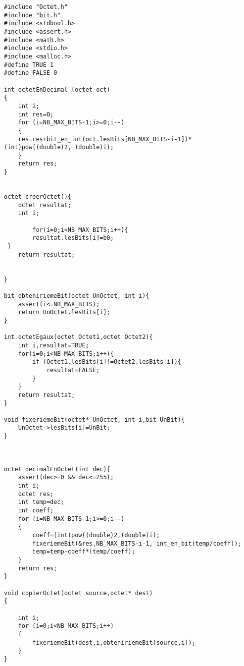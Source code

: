 \begin{verbatim}
#include "Octet.h"
#include "bit.h"
#include <stdbool.h>
#include <assert.h>
#include <math.h>
#include <stdio.h>
#include <malloc.h>
#define TRUE 1
#define FALSE 0

int octetEnDecimal (octet oct)
{
	int i;
	int res=0;
	for (i=NB_MAX_BITS-1;i>=0;i--)
	{
	res=res+bit_en_int(oct.lesBits[NB_MAX_BITS-i-1])* (int)pow((double)2, (double)i);
	}
	return res;
}


octet creerOctet(){
    octet resultat;
    int i;

		for(i=0;i<NB_MAX_BITS;i++){
        resultat.lesBits[i]=b0;
 }
    return resultat;


}

bit obteniriemeBit(octet UnOctet, int i){
    assert(i<=NB_MAX_BITS);
    return UnOctet.lesBits[i];
}

int octetEgaux(octet Octet1,octet Octet2){
    int i,resultat=TRUE;
    for(i=0;i<NB_MAX_BITS;i++){
        if (Octet1.lesBits[i]!=Octet2.lesBits[i]){
            resultat=FALSE;
        }
    }
    return resultat;
}

void fixeriemeBit(octet* UnOctet, int i,bit UnBit){
    UnOctet->lesBits[i]=UnBit;
}



octet decimalEnOctet(int dec){
	assert(dec>=0 && dec<=255);
	int i;
	octet res;
	int temp=dec;
	int coeff;
	for (i=NB_MAX_BITS-1;i>=0;i--)
	{
		coeff=(int)pow((double)2,(double)i);
		fixeriemeBit(&res,NB_MAX_BITS-i-1, int_en_bit(temp/coeff));
		temp=temp-coeff*(temp/coeff);
	}
	return res;
}

void copierOctet(octet source,octet* dest)
{

	int i;
	for (i=0;i<NB_MAX_BITS;i++)
	{
		fixeriemeBit(dest,i,obteniriemeBit(source,i));
	}
}

\end{verbatim}
 
